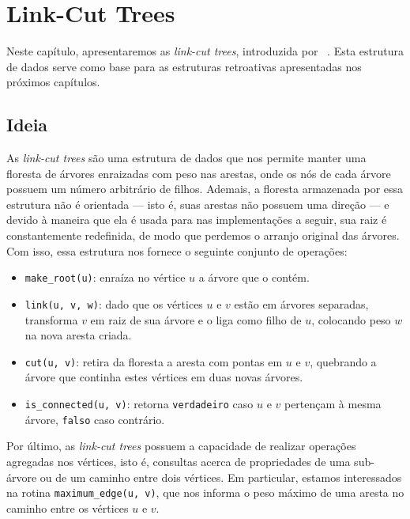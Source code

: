 
\chapter{Link-Cut Trees}
\label{cap:link-cut-trees}

Neste capítulo, apresentaremos as \emph{link-cut trees}, introduzida por ~\citet{10.1145/800076.802464}. Esta estrutura de dados serve como base para as estruturas retroativas apresentadas nos próximos capítulos.

\section{Ideia}
\label{sec:lct-ideia}

As \emph{link-cut trees} são uma estrutura de dados que nos permite manter uma floresta de árvores enraizadas com peso nas arestas, onde os nós de cada árvore possuem um número arbitrário de filhos. Ademais, a floresta armazenada por essa estrutura não é orientada --- isto é, suas arestas não possuem uma direção --- e devido à maneira que ela é usada para nas implementações a seguir, sua raiz é constantemente redefinida, de modo que perdemos o arranjo original das árvores. Com isso, essa estrutura nos fornece o seguinte conjunto de operações:

\begin{itemize}
    \item \texttt{make\_root(u)}: enraíza no vértice $u$ a árvore que o contém.
    \item \texttt{link(u, v, w)}: dado que os vértices $u$ e $v$ estão em árvores separadas, transforma $v$ em raiz de sua árvore e o liga como filho de $u$, colocando peso $w$ na nova aresta criada.
    \item \texttt{cut(u, v)}: retira da floresta a aresta com pontas em $u$ e $v$, quebrando a árvore que continha estes vértices em duas novas árvores.
    \item \texttt{is\_connected(u, v)}: retorna \texttt{verdadeiro} caso $u$ e $v$ pertençam à mesma árvore, \texttt{falso} caso contrário.
\end{itemize}

Por último, as \emph{link-cut trees} possuem a capacidade de realizar operações agregadas nos vértices, isto é, consultas acerca de propriedades de uma sub-árvore ou de um caminho entre dois vértices. Em particular, estamos interessados na rotina \texttt{maximum\_edge(u, v)}, que nos informa o peso máximo de uma aresta no caminho entre os vértices $u$ e $v$.

